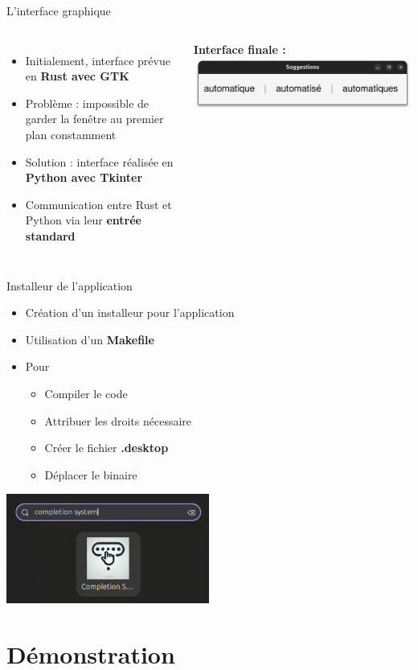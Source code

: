 \begin{frame}{L'interface graphique}
	\begin{columns}
		\begin{itemize}
			\item Initialement, interface prévue en \textbf{Rust avec GTK}
			\item Problème : impossible de garder la fenêtre au premier plan constamment
			\item Solution : interface réalisée en \textbf{Python avec Tkinter}
			\item Communication entre Rust et Python via leur \textbf{entrée standard}
		\end{itemize}

		\centering
		\textbf{Interface finale :} \\
		\includegraphics[width=\textwidth]{images/demo_interface.png}
	\end{columns}
\end{frame}


\begin{frame}{Installeur de l'application}
	\begin{itemize}
		\item Création d'un installeur pour l'application
		\item Utilisation d'un \textbf{Makefile}
		\item Pour
		      \begin{itemize}
			      \item Compiler le code
			      \item Attribuer les droits nécessaire
			      \item Créer le fichier \textbf{.desktop}
			      \item Déplacer le binaire
		      \end{itemize}
	\end{itemize}
	\begin{center}
		\includegraphics[width=0.5\textwidth]{images/application.png}
	\end{center}

\end{frame}

\section{Démonstration}%
